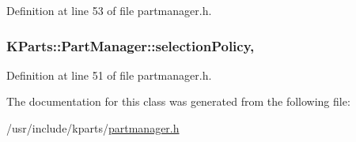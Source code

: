 Definition at line 53 of file partmanager.\+h.

\hypertarget{classKParts_1_1PartManager_a277840d67f7fbbacf3e11a272d649ac1}{
\subsubsection[{selection\+Policy}]{ K\+Parts\+::\+Part\+Manager\+::selection\+Policy\hspace{0.3cm}{\ttfamily [read]}, {\ttfamily [write]}}}\label{classKParts_1_1PartManager_a277840d67f7fbbacf3e11a272d649ac1}


Definition at line 51 of file partmanager.\+h.



The documentation for this class was generated from the following file\+:\begin{DoxyCompactItemize}
\item 
/usr/include/kparts/\hyperlink{partmanager_8h}{partmanager.\+h}\end{DoxyCompactItemize}
